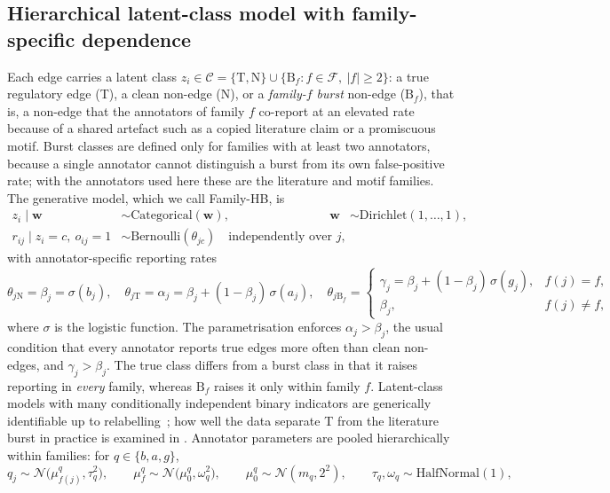 \documentclass[11pt,a4paper]{article}
\begin{document}
\subsection{Hierarchical latent-class model with family-specific dependence}\label{sec:model}
Each edge carries a latent class $z_i\in\mathcal{C}=\{\mathrm{T},\mathrm{N}\}\cup\{\mathrm{B}_f: f\in\mathcal{F},\ |f|\ge 2\}$: a true regulatory edge (T), a clean non-edge (N), or a \emph{family-$f$ burst} non-edge ($\mathrm{B}_f$), that is, a non-edge that the annotators of family $f$ co-report at an elevated rate because of a shared artefact such as a copied literature claim or a promiscuous motif.
Burst classes are defined only for families with at least two annotators, because a single annotator cannot distinguish a burst from its own false-positive rate; with the annotators used here these are the literature and motif families.
The generative model, which we call Family-HB, is
\begin{align}
  z_i \mid \mathbf{w} &\sim \mathrm{Categorical}(\mathbf{w}), & \mathbf{w}&\sim\mathrm{Dirichlet}(1,\dots,1), \label{eq:class}\\
  r_{ij}\mid z_i=c,\ o_{ij}=1 &\sim \mathrm{Bernoulli}(\theta_{jc}) \quad\text{independently over } j, \label{eq:emission}
\end{align}
with annotator-specific reporting rates
\begin{equation}
  \theta_{j\mathrm{N}}=\beta_j=\sigma(b_j),\quad
  \theta_{j\mathrm{T}}=\alpha_j=\beta_j+(1-\beta_j)\,\sigma(a_j),\quad
  \theta_{j\mathrm{B}_f}=\begin{cases}\gamma_j=\beta_j+(1-\beta_j)\,\sigma(g_j), & f(j)=f,\\ \beta_j, & f(j)\neq f,\end{cases}
  \label{eq:rates}
\end{equation}
where $\sigma$ is the logistic function.
The parametrisation enforces $\alpha_j>\beta_j$, the usual condition that every annotator reports true edges more often than clean non-edges, and $\gamma_j>\beta_j$.
The true class differs from a burst class in that it raises reporting in \emph{every} family, whereas $\mathrm{B}_f$ raises it only within family $f$. Latent-class models with many conditionally independent binary indicators are generically identifiable up to relabelling~\citep{allman2009identifiability}; how well the data separate T from the literature burst in practice is examined in .
Annotator parameters are pooled hierarchically within families: for $q\in\{b,a,g\}$,
\begin{equation}
  q_j \sim \mathcal{N}\big(\mu^{q}_{f(j)},\tau_q^2\big),\qquad
  \mu^{q}_{f}\sim\mathcal{N}\big(\mu^{q}_0,\omega_q^2\big),\qquad
  \mu^{q}_0\sim\mathcal{N}(m_q,2^2),\qquad
  \tau_q,\omega_q\sim\mathrm{HalfNormal}(1),
  \label{eq:hier}
\end{equation}
\end{document}
